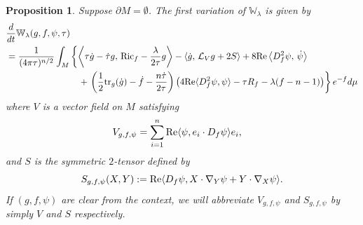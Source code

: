 \documentclass{amsart}
\newtheorem{proposition}[theorem]{Proposition}
\theoremstyle{definition}
\theoremstyle{remark}
\numberwithin{equation}{section}
\newcommand{\tr}{\textup{tr}}
\newcommand{\Ric}{\textup{Ric}}
\begin{document}
\begin{proposition}
\label{prop:var_W}
Suppose $\partial M = \emptyset$. The first variation of $\mathbb{W}_\lambda$ is given by
\begin{align}
\label{eq:var_W_U}
		& \frac{d}{dt}\mathbb{W}_\lambda(g,f,\psi,\tau)\\
&=  \frac{1}{(4\pi\tau)^{n/2}}\int_M \left\{ \left\langle \tau\dot{g} - \dot{\tau}g,\, \Ric_f - \frac{\lambda}{2\tau}g  \right\rangle - \left\langle \dot{g},\,  \mathcal{L}_{V} g + 2S \right\rangle + 8\textup{Re} \left\langle D_f^2\psi,\, \dot{\psi} \right\rangle\right.\nonumber\\
&\hskip 2.8cm + \left.\left(\frac{1}{2}\tr_g(\dot{g}) - \dot{f} -  \frac{n\dot\tau}{2\tau}\right)\left(4\textup{Re}\langle D_f^2\psi, \psi\rangle-\tau R_f - \lambda(f-n-1)\right)\right\} e^{-f} d\mu\nonumber
	\end{align}
where $V$ is a vector field on $M$ satisfying
\begin{align}
\label{eq:V}
V_{g,f,\psi} & = \sum_{i=1}^n \textup{Re}\langle \psi, e_i \cdot D_f\psi\rangle e_i,
\end{align}
and $S$ is the symmetric $2$-tensor defined by
\begin{equation}
\label{eq:S}
S_{g,f,\psi}(X,Y) := \textup{Re}\langle D_f\psi, X \cdot \nabla_Y \psi + Y \cdot \nabla_X \psi\rangle.
\end{equation}
If $(g,f,\psi)$ are clear from the context, we will abbreviate $V_{g,f,\psi}$ and $S_{g,f,\psi}$ by simply $V$ and $S$ respectively.

\end{proposition}
\end{document}
